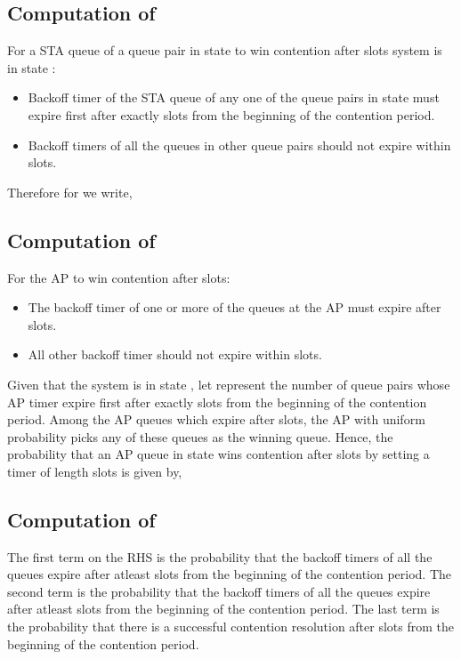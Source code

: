 \documentclass[10pt,conference]{IEEEtran}
\begin{document}
\subsection{Computation of  }

For a STA queue of a queue pair in state  to win contention after  slots system is in state :
\begin{itemize}
 \item Backoff timer of  the STA queue of any one of the  queue pairs in state  must expire first after exactly  slots from the beginning of the contention period.
 \item Backoff timers of all the queues in other queue pairs should not expire within  slots.
\end{itemize}

 
Therefore for  we write,




\subsection{Computation of  }
\label{app_oppsched2}
For the AP to win contention after  slots:
\begin{itemize}
 \item  The backoff timer of one or more of the queues at the AP must expire after  slots.
 \item  All other backoff timer should not expire within  slots.
\end{itemize}

Given that the system is in state , let  represent the number of queue pairs whose AP timer expire first after exactly  slots from the beginning of the contention period.
Among the AP queues which expire after  slots, the AP with uniform probability picks any of these queues as the winning queue.
Hence, the probability that an AP queue in state  wins contention after  slots by setting a timer of length  slots is given by,





\subsection{Computation of }
\label{app_oppsched3}


The first term on the RHS is the probability that the backoff timers of all the queues  expire after atleast  slots from the beginning of the contention period.
The second term is the probability that the backoff timers of all the queues expire after atleast  slots from the beginning of the contention period.
The last term is the probability that there is a successful contention resolution after  slots from the beginning of the contention period.
\end{document}
